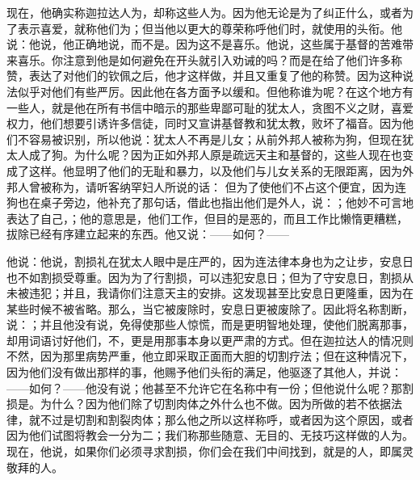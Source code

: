 现在，他确实称迦拉达人为，却称这些人为。因为他无论是为了纠正什么，或者为了表示喜爱，就称他们为；但当他以更大的尊荣称呼他们时，就使用的头衔。他说：他说，他正确地说，而不是。因为这不是喜乐。他说，这些属于基督的苦难带来喜乐。你注意到他是如何避免在开头就引入劝诫的吗？而是在给了他们许多称赞，表达了对他们的钦佩之后，他才这样做，并且又重复了他的称赞。因为这种说法似乎对他们有些严厉。因此他在各方面予以缓和。但他称谁为呢？在这个地方有一些人，就是他在所有书信中暗示的那些卑鄙可耻的犹太人，贪图不义之财，喜爱权力，他们想要引诱许多信徒，同时又宣讲基督教和犹太教，败坏了福音。因为他们不容易被识别，所以他说：犹太人不再是儿女；从前外邦人被称为狗，但现在犹太人成了狗。为什么呢？因为正如外邦人原是疏远天主和基督的，这些人现在也变成了这样。他显明了他们的无耻和暴力，以及他们与儿女关系的无限距离，因为外邦人曾被称为，请听客纳罕妇人所说的话： 但为了使他们不占这个便宜，因为连狗也在桌子旁边，他补充了那句话，借此也指出他们是外人，说：；他妙不可言地表达了自己，；他的意思是，他们工作，但目的是恶的，而且工作比懒惰更糟糕，拔除已经有序建立起来的东西。他又说：——如何？——\par

他说：他说，割损礼在犹太人眼中是庄严的，因为连法律本身也为之让步，安息日也不如割损受尊重。因为为了行割损，可以违犯安息日；但为了守安息日，割损从未被违犯；并且，我请你们注意天主的安排。这发现甚至比安息日更隆重，因为在某些时候不被省略。那么，当它被废除时，安息日更被废除了。因此将名称割断，说：；并且他没有说，免得使那些人惊慌，而是更明智地处理，使他们脱离那事，却用词语讨好他们，不，更是用那事本身以更严肃的方式。但在迦拉达人的情况则不然，因为那里病势严重，他立即采取正面而大胆的切割疗法；但在这种情况下，因为他们没有做出那样的事，他赐予他们头衔的满足，他驱逐了其他人，并说：——如何？——他没有说；他甚至不允许它在名称中有一份；但他说什么呢？那割损是。为什么？因为他们除了切割肉体之外什么也不做。因为所做的若不依据法律，就不过是切割和割裂肉体；那么他之所以这样称呼，或者因为这个原因，或者因为他们试图将教会一分为二；我们称那些随意、无目的、无技巧这样做的人为。现在，他说，如果你们必须寻求割损，你们会在我们中间找到，就是的人，即属灵敬拜的人。\par


